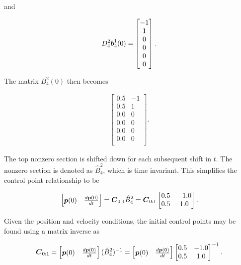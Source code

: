 and

\begin{align}
    D^2_4 \boldsymbol{b}^1_4(0) = 
    \begin{bmatrix}
        -1\\
        1\\
        0\\
        0\\
        0\\
        0\\
    \end{bmatrix}.
\end{align}

The matrix $B_4^2(0)$ then becomes

\begin{align}
    \begin{bmatrix}
        0.5 & -1\\
        0.5 & 1\\
        0.0 & 0\\
        0.0 & 0\\
        0.0 & 0\\
        0.0 & 0\\
    \end{bmatrix}.
\end{align}

The top nonzero section is shifted down for each subsequent shift in $t$. 
The nonzero section is denoted as $\hat{B}_4^2$, which is time invariant. 
This simplifies the control point relationship to be

\begin{align}
    \begin{bmatrix}
        \boldsymbol{p}(0) & \frac{d\boldsymbol{p}(0)}{dt}
    \end{bmatrix}
	= \boldsymbol{C}_{0:1}
    \hat{B}_4^2
	= \boldsymbol{C}_{0:1}
    \begin{bmatrix}
        0.5 & -1.0\\
        0.5 & 1.0\\
    \end{bmatrix}.
\end{align}

Given the position and velocity conditions, the initial control points may be found using a matrix inverse as

\begin{align}
    \boldsymbol{C}_{0:1} =
    \begin{bmatrix}
        \boldsymbol{p}(0) & \frac{d\boldsymbol{p}(0)}{dt}
    \end{bmatrix}
    (\hat{B}_4^2)^{-1}
	=
    \begin{bmatrix}
        \boldsymbol{p}(0) & \frac{d\boldsymbol{p}(0)}{dt}
    \end{bmatrix}
    \begin{bmatrix}
        0.5 & -1.0\\
        0.5 & 1.0\\
    \end{bmatrix}^{-1}.
\end{align}

